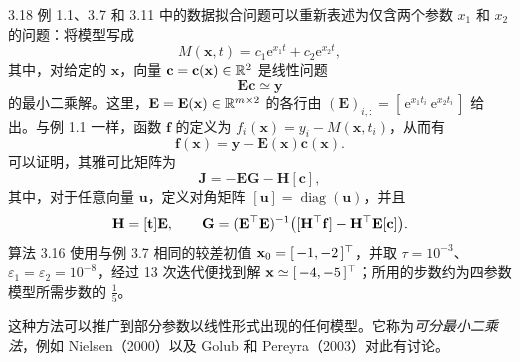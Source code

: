 \begin{example}{3.18}
例 1.1、3.7 和 3.11 中的数据拟合问题可以重新表述为仅含两个参数 $x_1$ 和 $x_2$ 的问题：将模型写成
\[
  M(\mathbf x,t)=c_1\mathrm e^{x_1t}+c_2\mathrm e^{x_2t},
\]
其中，对给定的 $\mathbf x$，向量 $\mathbf c=\mathbf c(\mathbf x)\in\mathbb{R}^2$ 是线性问题
\[
  \mathbf E\mathbf c\simeq\mathbf y
\]
的最小二乘解。这里，$\mathbf E=\mathbf E(\mathbf x)\in\mathbb{R}^{m\times2}$ 的各行由
$(\mathbf E)_{i,:}=[\,\mathrm e^{x_1t_i}\ \mathrm e^{x_2t_i}\,]$
给出。与例 1.1 一样，函数 $\mathbf f$ 的定义为 $f_i(\mathbf x)=y_i-M(\mathbf x,t_i)$，从而有
\[
  \mathbf f(\mathbf x)=\mathbf y-\mathbf E(\mathbf x)\mathbf c(\mathbf x).
\]
可以证明，其雅可比矩阵为
\[
  \mathbf J=-\mathbf E\mathbf G-\mathbf H[\mathbf c],
\]
其中，对于任意向量 $\mathbf u$，定义对角矩阵 $[\mathbf u]=\operatorname{diag}(\mathbf u)$，并且
\[
  \mathbf H=[\mathbf t]\mathbf E,\qquad
  \mathbf G=(\mathbf E^{\top}\mathbf E)^{-1}
    \bigl([\mathbf H^{\top}\mathbf f]-\mathbf H^{\top}\mathbf E[\mathbf c]\bigr).
\]
算法 3.16 使用与例 3.7 相同的较差初值 $\mathbf x_0=[\,-1,-2\,]^{\top}$，并取 $\tau=10^{-3}$、$\varepsilon_1=\varepsilon_2=10^{-8}$，经过 13 次迭代便找到解 $\mathbf x\simeq[\,-4,-5\,]^{\top}$；所用的步数约为四参数模型所需步数的 $\frac15$。

这种方法可以推广到部分参数以线性形式出现的任何模型。它称为\emph{可分最小二乘法}，例如 Nielsen（2000）以及 Golub 和 Pereyra（2003）对此有讨论。
\end{example}

